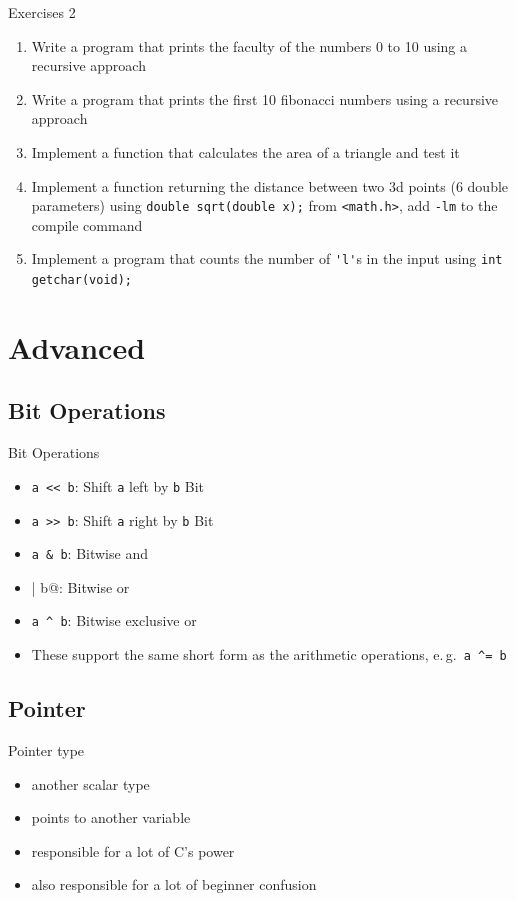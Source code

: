 \documentclass[english,compress]{beamer}
\begin{document}
\begin{frame}[fragile]{Exercises 2}
	\begin{enumerate}
		\item Write a program that prints the faculty of the numbers 0 to 10 using a recursive approach
		\item Write a program that prints the first 10 fibonacci numbers using a recursive approach
		\item Implement a function that calculates the area of a triangle and test it
		\item Implement a function returning the distance between two 3d points (6 double parameters) using \lstinline|double sqrt(double x);| from \lstinline|<math.h>|, add \verb|-lm| to the compile command
		\item Implement a program that counts the number of \lstinline|'l'|s in the input using \lstinline|int getchar(void);|
	\end{enumerate}
\end{frame}

\section{Advanced}
\subsection{Bit Operations}
\begin{frame}{Bit Operations}
	\begin{itemize}
		\item \lstinline|a << b|: Shift \lstinline|a| left by \lstinline|b| Bit
		\item \lstinline|a >> b|: Shift \lstinline|a| right by \lstinline|b| Bit
		\item \lstinline|a & b|: Bitwise and
		\item \lstinline@a | b@: Bitwise or
		\item \lstinline|a ^ b|: Bitwise exclusive or
		\item These support the same short form as the arithmetic operations, e.\,g.\ \lstinline|a ^= b|
	\end{itemize}
\end{frame}

\subsection{Pointer}
\begin{frame}{Pointer type}
	\begin{itemize}
		\item another scalar type
		\item points to another variable
		\item responsible for a lot of C's power
		\item also responsible for a lot of beginner confusion
	\end{itemize}
\end{frame}
\end{document}
